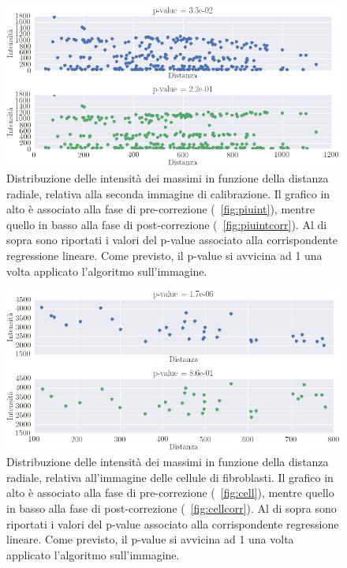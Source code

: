\begin{figure}
 \centering
 \includegraphics[scale=.55]{img/CAP4pvalue2.png}
 \caption{\small{Distribuzione delle intensità dei massimi in funzione della distanza radiale, relativa alla seconda immagine di calibrazione. Il grafico in alto è associato alla fase di pre-correzione (\figurename~\ref{fig:piuint}), mentre quello in basso alla fase di post-correzione (\figurename~\ref{fig:piuintcorr}). Al di sopra sono riportati i valori del p-value associato alla corrispondente regressione lineare. Come previsto, il p-value si avvicina ad 1 una volta applicato l'algoritmo sull'immagine.}}
 \label{fig:pvalue2}
\end{figure}

\begin{figure}
 \centering
 \includegraphics[scale=.55]{img/CAP4pvalue3.png}
 \caption{\small{
 Distribuzione delle intensità dei massimi in funzione della distanza radiale, relativa all'immagine delle cellule di fibroblasti. Il grafico in alto è associato alla fase di pre-correzione (\figurename~\ref{fig:cell}), mentre quello in basso alla fase di post-correzione (\figurename~\ref{fig:cellcorr}). Al di sopra sono riportati i valori del p-value associato alla corrispondente regressione lineare. Come previsto, il p-value si avvicina ad 1 una volta applicato l'algoritmo sull'immagine.}}
 \label{fig:pvalue3}
\end{figure}

